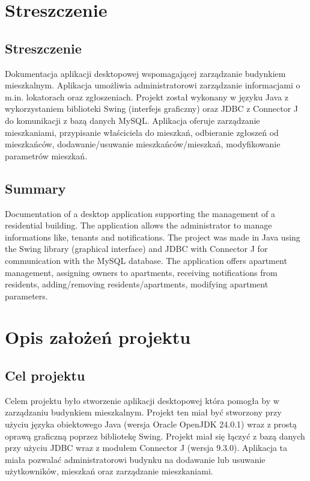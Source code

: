 \chapter{Streszczenie}
\label{cha:elementyPracyproj}

\section{Streszczenie}
Dokumentacja aplikacji desktopowej wspomagającej zarządzanie budynkiem mieszkalnym. 
Aplikacja umożliwia administratorowi zarządzanie informacjami o m.in. lokatorach oraz zgłoszeniach. 
Projekt został wykonany w języku Java z wykorzystaniem biblioteki Swing (interfejs graficzny) oraz JDBC z Connector J do komunikacji z bazą danych MySQL. 
Aplikacja oferuje zarządzanie mieszkaniami, przypisanie właściciela do mieszkań, odbieranie zgłoszeń od mieszkańców,
dodawanie/usuwanie mieszkańców/mieszkań, modyfikowanie parametrów mieszkań.

\section{Summary}
Documentation of a desktop application supporting the management of a residential building. 
The application allows the administrator to manage informations like, tenants and notifications. 
The project was made in Java using the Swing library (graphical interface) and JDBC with Connector J for communication with the MySQL database. 
The application offers apartment management, assigning owners to apartments, receiving notifications from residents, 
adding/removing residents/apartments, modifying apartment parameters.

\newpage
\chapter{Opis założeń projektu}
\section{Cel projektu}
Celem projektu było stworzenie aplikacji desktopowej która pomogła by w zarządzaniu budynkiem mieszkalnym. Projekt ten miał być 
stworzony przy użyciu języka obiektowego Java (wersja Oracle OpenJDK 24.0.1) wraz z prostą oprawą graficzną poprzez bibliotekę Swing.
Projekt miał się łączyć z bazą danych przy użyciu JDBC wraz z modułem Connector J (wersja 9.3.0). Aplikacja ta miała pozwalać 
administratorowi budynku na dodawanie lub usuwanie użytkowników, mieszkań oraz zarządzanie mieszkaniami.

